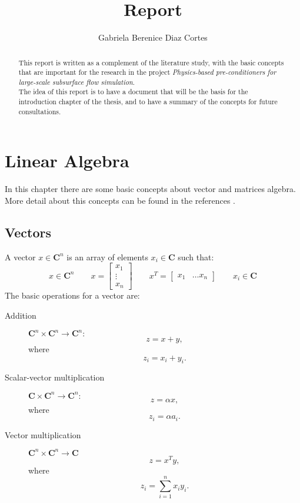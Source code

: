 \documentclass[a4paper,10pt]{report}
\title{Report}
\author{Gabriela Berenice Diaz Cortes}
\date{}
\begin{document}
\maketitle
\begin{abstract}
 This report is written as a complement of the literature study, with the basic concepts that 
 are important for the research in the project \emph{Physics-based pre-conditioners for 
 large-scale subsurface flow simulation}.\\
 The idea of this report is to have a document that will be the basis for the introduction
 chapter of the thesis, and to have a summary of the concepts for future consultations.
\end{abstract}


\chapter{Linear Algebra}
In this chapter there are some basic concepts about vector and matrices algebra. More detail 
about this concepts can be found in the references \cite{Saad03,Golub96}.
\section{Vectors}
A vector $x \in \mathbf{C}^n$ is an array of elements $x_i \in \mathbf{C}$ such that:
\begin{equation*}
 x\in \mathbf{C}^n \qquad x=
 \begin{bmatrix}
 x_1 \\
 \vdots \\
 x_n
 \end{bmatrix}
 \qquad x^T=
 \begin{bmatrix}
 x_1 & \dots x_n
 \end{bmatrix}
 \qquad x_i \in \mathbf{C}
\end{equation*}
The basic operations for a vector are:
\begin{description}
 \item[Addition] $\mathbf{C}^{n} \times \mathbf{C}^{n} \xrightarrow{} \mathbf{C}^{n}:$
$$z=x+y,$$ where $$z_{i}=x_{i}+y_{i}.$$
\item [Scalar-vector multiplication] $\mathbf{C} \times \mathbf{C}^{n} \xrightarrow{} \mathbf{C}^{n}:$
$$z=\alpha x,$$ where $$z_{i}=\alpha a_{i}.$$
\item [Vector multiplication] $\mathbf{C}^{n} \times \mathbf{C}^{n} \xrightarrow{} \mathbf{C}$
$$z=x^Ty,$$ where $$z_{i}=\sum_{i=1}^n x_{i}y_{i}.$$
\end{description}
\end{document}
